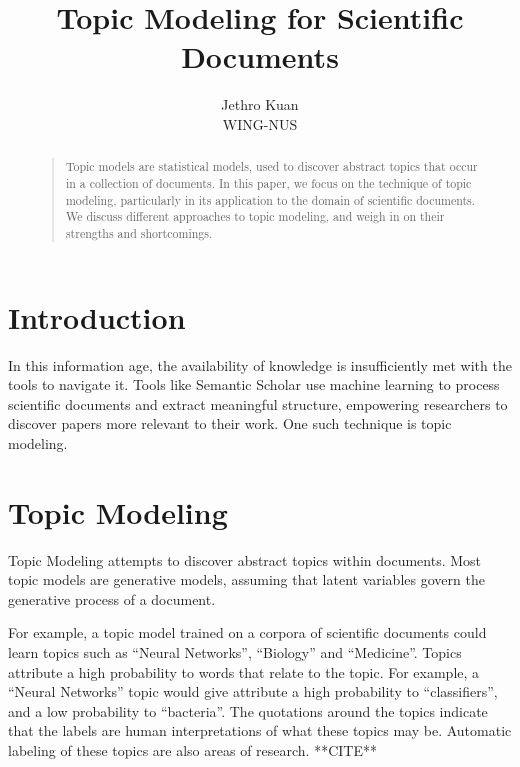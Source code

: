 \documentclass[letterpaper]{article}
\begin{document}
\nocopyright


\title{Topic Modeling for Scientific Documents}
\author{Jethro Kuan \\
  WING-NUS\\
}
\maketitle
\begin{abstract}
  \begin{quote}
    Topic models are statistical models, used to discover abstract
    topics that occur in a collection of documents. In this paper, we
    focus on the technique of topic modeling, particularly in its
    application to the domain of scientific documents. We discuss
    different approaches to topic modeling, and weigh in on their
    strengths and shortcomings.
  \end{quote}
\end{abstract}

\section{Introduction}
In this information age, the availability of knowledge is
insufficiently met with the tools to navigate it. Tools like Semantic
Scholar use machine learning to process scientific documents and
extract meaningful structure, empowering researchers to discover
papers more relevant to their work. One such technique is topic
modeling.

\section {Topic Modeling}
Topic Modeling attempts to discover abstract topics within documents.
Most topic models are generative models, assuming that latent
variables govern the generative process of a document.

For example, a topic model trained on a corpora of scientific
documents could learn topics such as ``Neural Networks'', ``Biology''
and ``Medicine''. Topics attribute a high probability to words that
relate to the topic. For example, a ``Neural Networks'' topic
would give attribute a high probability to ``classifiers'', and a low
probability to ``bacteria''. The quotations around the topics indicate
that the labels are human interpretations of what these topics may be.
Automatic labeling of these topics are also areas of research.
**CITE**
\end{document}
